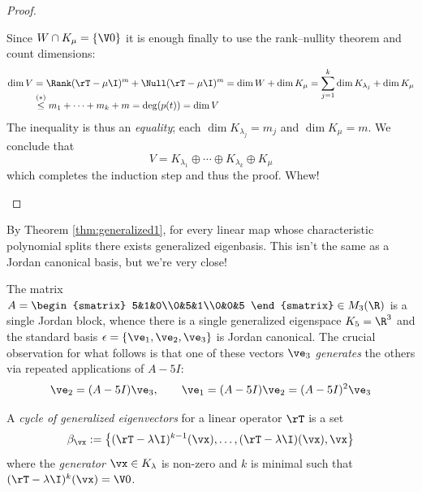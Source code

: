 \begin{proof}
\begin{description}
Since $W\cap K_\mu=\{\V0\}$ it is enough finally to use the rank--nullity theorem and count dimensions:\vspace{-8pt}
\begin{align*}
\dim V&=\Rank (\rT-\mu\I)^{m}+\Null (\rT-\mu\I)^{m}=\dim W+\dim K_\mu =\smash[b]{\sum_{j=1}^k}\dim K_{\lambda_j}+\dim K_\mu\\
&\overset{(\ast)}{\le} m_1+\cdots+m_k+m =\operatorname{deg}(p(t))=\dim V
\end{align*}
The inequality is thus an \emph{equality}; each $\dim K_{\lambda_j}=m_j$ and $\dim K_\mu=m$. We conclude that
\[V=K_{\lambda_1}\oplus\cdots\oplus K_{\lambda_{k}}\oplus K_\mu\]
which completes the induction step and thus the proof. Whew!\qedhere
\end{description}
\end{proof}



\goodbreak


By Theorem \ref{thm:generalized1}, for every linear map whose characteristic polynomial splits there exists generalized eigenbasis. This isn't the same as a Jordan canonical basis, but we're very close!

\begin{example}{}{}
The matrix $A=\begin{smatrix}
5&1&0\\0&5&1\\0&0&5
\end{smatrix}\in M_3(\R)$ is a single Jordan block, whence there is a single generalized eigenspace $K_5=\R^3$ and the standard basis $\epsilon=\{\ve_1,\ve_2,\ve_3\}$ is Jordan canonical.\smallbreak
The crucial observation for what follows is that one of these vectors $\ve_3$ \emph{generates} the others via repeated applications of $A-5I$:
\[\ve_2=(A-5I)\ve_3,\qquad \ve_1=(A-5I)\ve_2=(A-5I)^2\ve_3\]
\end{example}


\begin{defn}{}{}
A \emph{cycle of generalized eigenvectors} for a linear operator $\rT$ is a set
\[\beta_\vx:=\smash{\left\{(\rT-\lambda \I)^{k-1}(\vx),\ldots,(\rT-\lambda \I)(\vx),\vx\right\}}\]
where the \emph{generator} $\vx\in K_\lambda$ is non-zero and $k$ is minimal such that $(\rT-\lambda \I)^k(\vx)=\V0$.
\end{defn}

